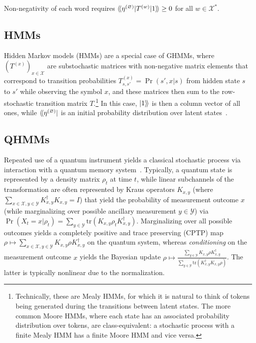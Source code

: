 \documentclass[prx,nofootinbib,onecolumn,showkeys,groupaddress,preprintnumbers,floatfix,
superscriptaddress]{revtex4-1}
\newcommand{\dbra}[1]{\bra{ \! \langle #1}}
\newcommand{\dket}[1]{\ket{ #1 \rangle \!}}
\newcommand{\dbraket}[1]{\braket{ \! \langle #1 \rangle \!}}
\newcommand{\init}{\dbra{\eta^{(\varnothing)}}}
\newcommand{\tr}{\text{tr}}
\begin{document}
Non-negativity of each word requires 
$\dbraket{\eta^{(\varnothing)} | T^{(w)} | 1}  \geq 0$
for all $w \in \mathcal{X}^*$.

\subsection{HMMs}

Hidden Markov models (HMMs) are a special case of GHMMs, where 
$(T^{(x)})_{x\in \mathcal{X}}$ are substochastic matrices 
with non-negative matrix elements that correspond to transition probabilities $T^{(x)}_{s,s'} = \Pr(s', x | s)$ from hidden state $s$ to $s'$ while observing the symbol $x$,
and these matrices then
sum to the row-stochastic transition matrix $T$.\footnote{Technically, these are Mealy HMMs, for which it is natural to think of tokens being generated during the transitions between latent states. The more common Moore HMMs, where each state has an associated probability distribution over tokens, are class-equivalent: a stochastic process with a finite Mealy HMM has a finite Moore HMM and vice versa.} 
In this case, $\dket{1}$ is then a column vector of all ones, while $\init$ is an initial probability distribution over latent states~\cite{Riec18_SSAC1}.

\subsection{QHMMs}

Repeated use of a quantum instrument yields a classical stochastic process via interaction with a quantum memory system~\cite{Monras16_Quantum, Elliott22_Quantum, Zonnios25_Quantum}.  
Typically, a quantum state is represented by a density matrix $\rho_t$ at time $t$, while linear subchannels of the transformation are often represented by Kraus operators 
$K_{x,y}$ (where $\sum_{x \in \mathcal{X}, y \in \mathcal{Y}}  K_{x,y}^\dagger K_{x,y} = I$) 
that 
yield the probability of measurement outcome $x$ (while marginalizing over possible ancillary measurement $y \in \mathcal{Y}$) via 
$\Pr(X_t =x | \rho_t) = \sum_{y \in \mathcal{Y}} \tr( K_{x,y} \rho_t K_{x,y}^\dagger)$.
Marginalizing over all possible outcomes yields a completely positive and trace preserving (CPTP) map $\rho \mapsto \sum_{x \in \mathcal{X}, y \in \mathcal{Y}} K_{x,y} \rho K_{x,y}^\dagger$ on the quantum system, whereas \emph{conditioning} on the measurement outcome $x$ yields the Bayesian update 
$\rho \mapsto \frac{\sum_{y \in \mathcal{Y}} K_{x,y} \rho K_{x,y}^\dagger }{\sum_{y \in \mathcal{Y}} \text{tr}( K_{x,y}^\dagger K_{x,y} \rho )}$.
The latter is typically nonlinear due to the normalization.
\end{document}
